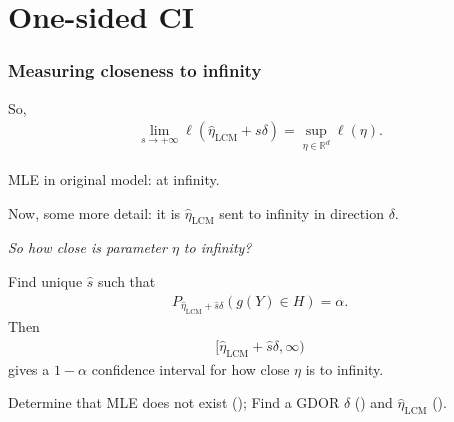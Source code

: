 \documentclass[ 10pt]{beamer}
\def\RR{{\mathbb R}}
\newcommand{\etaLCM}{\hat{\eta}_{\textrm{LCM}}}
\begin{document}
\section{One-sided CI}
\frame
{
  \frametitle{Measuring closeness to infinity}  
So,
\begin{align*}
	\lim_{s \to +\infty} \ell(\etaLCM + s\delta) = \sup_{\eta \in \RR^d} \ell(\eta).
\end{align*}	

MLE in original model: at infinity.

Now, some more detail: it is $\etaLCM$ sent to infinity in direction $\delta$.
\vspace{4mm}


\emph{So how close is parameter $\eta$ to infinity?  }
\vspace{2mm}

\pause
Find unique $\hat{s}$ such that
\begin{align*}
		P_{\etaLCM + \hat{s} \delta}( g(Y) \in H) = \alpha.
\end{align*}
Then
\begin{align*}
[ \etaLCM + \hat{s} \delta, \infty)
\end{align*}
gives a $1 - \alpha$ confidence interval for how close $\eta$ is to infinity.

\pause
\begin{block}{}
Determine that MLE does not exist (\checkmark); Find a GDOR $\delta$ (\checkmark) and $\etaLCM$ (\checkmark).
\end{block}
}

%
%
\end{document}
